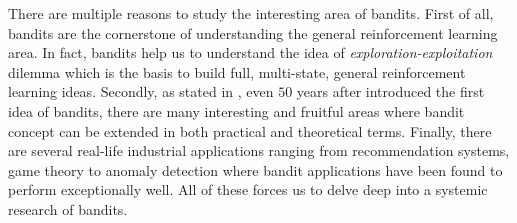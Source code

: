 There are multiple reasons to study the interesting area of bandits. First of all, bandits are the cornerstone of understanding the general reinforcement learning area. In fact, bandits help us to understand the idea of \textit{exploration-exploitation} dilemma which is the basis to build full, multi-state, general reinforcement learning ideas. Secondly, as stated in \citet{maillard2011apprentissage}, even $50$ years after \cite{robbins1952some} introduced the first idea of bandits, there are many interesting and fruitful areas where bandit concept can be extended in both practical and theoretical terms. Finally, there are several real-life industrial applications ranging from recommendation systems, game theory to anomaly detection where bandit applications have been found to perform exceptionally well. All of these forces us to delve deep into a systemic research of bandits.

